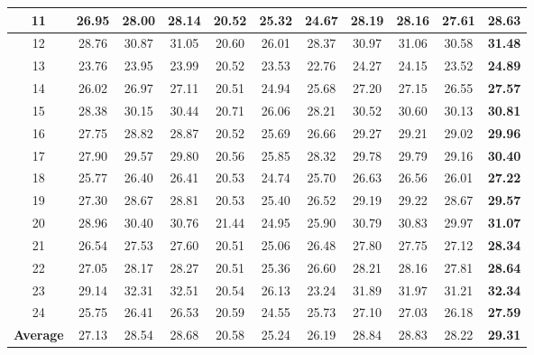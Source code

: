 \begin{table}
\begin{center}
\begin{tabular}{|c||c|c|c|c|c|c|c|c|c|c|}
\\
\hline
11& 26.95 & 28.00 & 28.14 & 20.52 & 25.32 & 24.67 & 28.19 & 28.16 & 27.61 & \textbf{28.63}
\\
\hline
12& 28.76 & 30.87 & 31.05 & 20.60 & 26.01 & 28.37 & 30.97 & 31.06 & 30.58 & \textbf{31.48}
\\
\hline
13& 23.76 & 23.95 & 23.99 & 20.52 & 23.53 & 22.76 & 24.27 & 24.15 & 23.52 & \textbf{24.89}
\\
\hline
14& 26.02 & 26.97 & 27.11 & 20.51 & 24.94  & 25.68 & 27.20 & 27.15 & 26.55 & \textbf{27.57}
\\
\hline
15& 28.38 & 30.15 & 30.44 & 20.71 & 26.06 & 28.21 & 30.52 & 30.60 & 30.13 & \textbf{30.81}
\\
\hline
16& 27.75 & 28.82 & 28.87 & 20.52 & 25.69 & 26.66 & 29.27 & 29.21 & 29.02 & \textbf{29.96}
\\
\hline
17& 27.90 & 29.57 & 29.80 & 20.56 & 25.85 & 28.32 & 29.78 & 29.79 & 29.16 & \textbf{30.40}
\\
\hline
18& 25.77 & 26.40 & 26.41 & 20.53 & 24.74 & 25.70 & 26.63 & 26.56 & 26.01 & \textbf{27.22}
\\
\hline
19& 27.30 & 28.67 & 28.81 & 20.53 & 25.40 & 26.52 & 29.19 & 29.22 & 28.67 & \textbf{29.57}
\\
\hline
20& 28.96 & 30.40 & 30.76 & 21.44 & 24.95 & 25.90 & 30.79 & 30.83 & 29.97 & \textbf{31.07}
\\
\hline
21& 26.54 & 27.53 & 27.60 & 20.51 & 25.06 & 26.48 & 27.80 & 27.75 & 27.12 & \textbf{28.34}
\\
\hline
22& 27.05 & 28.17 & 28.27 & 20.51 & 25.36 & 26.60 & 28.21 & 28.16 & 27.81 & \textbf{28.64}
\\
\hline
23& 29.14 & 32.31 & 32.51 & 20.54 & 26.13 & 23.24 & 31.89 & 31.97 & 31.21 & \textbf{32.34}
\\
\hline
24& 25.75 & 26.41 & 26.53 & 20.59 & 24.55 & 25.73 & 27.10 & 27.03 & 26.18 & \textbf{27.59}
\\
\hline
\textbf{Average} 
& 27.13 & 28.54 & 28.68 & 20.58 & 25.24 & 26.19 & 28.84 & 28.83 & 28.22 & \textbf{29.31}
\\
\hline
\end{tabular}
\end{center}
\end{table}

